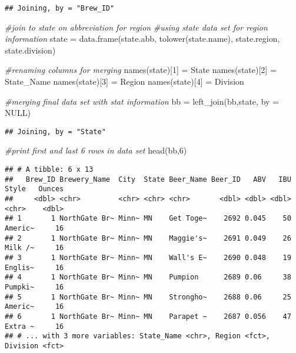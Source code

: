 \documentclass[
]{article}
\newenvironment{Shaded}{\begin{snugshade}}{\end{snugshade}}
\newcommand{\AttributeTok}[1]{\textcolor[rgb]{0.77,0.63,0.00}{#1}}
\newcommand{\CommentTok}[1]{\textcolor[rgb]{0.56,0.35,0.01}{\textit{#1}}}
\newcommand{\ConstantTok}[1]{\textcolor[rgb]{0.00,0.00,0.00}{#1}}
\newcommand{\DecValTok}[1]{\textcolor[rgb]{0.00,0.00,0.81}{#1}}
\newcommand{\FunctionTok}[1]{\textcolor[rgb]{0.00,0.00,0.00}{#1}}
\newcommand{\NormalTok}[1]{#1}
\newcommand{\OtherTok}[1]{\textcolor[rgb]{0.56,0.35,0.01}{#1}}
\newcommand{\StringTok}[1]{\textcolor[rgb]{0.31,0.60,0.02}{#1}}
\begin{document}
\begin{verbatim}
## Joining, by = "Brew_ID"
\end{verbatim}

\begin{Shaded}
\begin{Highlighting}[]
\CommentTok{\#join to state on abbreviation for region}
\CommentTok{\#using state data set for region information}
\NormalTok{state }\OtherTok{=} \FunctionTok{data.frame}\NormalTok{(state.abb, }\FunctionTok{tolower}\NormalTok{(state.name),  state.region, state.division)}

\CommentTok{\#renaming columns for merging }
\FunctionTok{names}\NormalTok{(state)[}\DecValTok{1}\NormalTok{] }\OtherTok{=} \StringTok{\textquotesingle{}State\textquotesingle{}}
\FunctionTok{names}\NormalTok{(state)[}\DecValTok{2}\NormalTok{] }\OtherTok{=} \StringTok{\textquotesingle{}State\_Name\textquotesingle{}}
\FunctionTok{names}\NormalTok{(state)[}\DecValTok{3}\NormalTok{] }\OtherTok{=} \StringTok{\textquotesingle{}Region\textquotesingle{}}
\FunctionTok{names}\NormalTok{(state)[}\DecValTok{4}\NormalTok{] }\OtherTok{=} \StringTok{\textquotesingle{}Division\textquotesingle{}}

\CommentTok{\#merging final data set with stat information}
\NormalTok{bb }\OtherTok{=} \FunctionTok{left\_join}\NormalTok{(bb,state, }\AttributeTok{by =} \ConstantTok{NULL}\NormalTok{)}
\end{Highlighting}
\end{Shaded}

\begin{verbatim}
## Joining, by = "State"
\end{verbatim}

\begin{Shaded}
\begin{Highlighting}[]
\CommentTok{\#print first and last 6 rows in data set}
\FunctionTok{head}\NormalTok{(bb,}\DecValTok{6}\NormalTok{)}
\end{Highlighting}
\end{Shaded}

\begin{verbatim}
## # A tibble: 6 x 13
##   Brew_ID Brewery_Name  City  State Beer_Name Beer_ID   ABV   IBU Style   Ounces
##     <dbl> <chr>         <chr> <chr> <chr>       <dbl> <dbl> <dbl> <chr>    <dbl>
## 1       1 NorthGate Br~ Minn~ MN    Get Toge~    2692 0.045    50 Americ~     16
## 2       1 NorthGate Br~ Minn~ MN    Maggie's~    2691 0.049    26 Milk /~     16
## 3       1 NorthGate Br~ Minn~ MN    Wall's E~    2690 0.048    19 Englis~     16
## 4       1 NorthGate Br~ Minn~ MN    Pumpion      2689 0.06     38 Pumpki~     16
## 5       1 NorthGate Br~ Minn~ MN    Strongho~    2688 0.06     25 Americ~     16
## 6       1 NorthGate Br~ Minn~ MN    Parapet ~    2687 0.056    47 Extra ~     16
## # ... with 3 more variables: State_Name <chr>, Region <fct>, Division <fct>
\end{verbatim}
\end{document}
